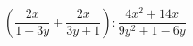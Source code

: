 \begin{ex}[type=expression]
	\begin{condition}
		\(\left( \dfrac{2x}{1-3y}+\dfrac{2x}{3y+1} \right):\dfrac{4x^2+14x}{9y^2+1-6y}\)
	\end{condition}
\end{ex}